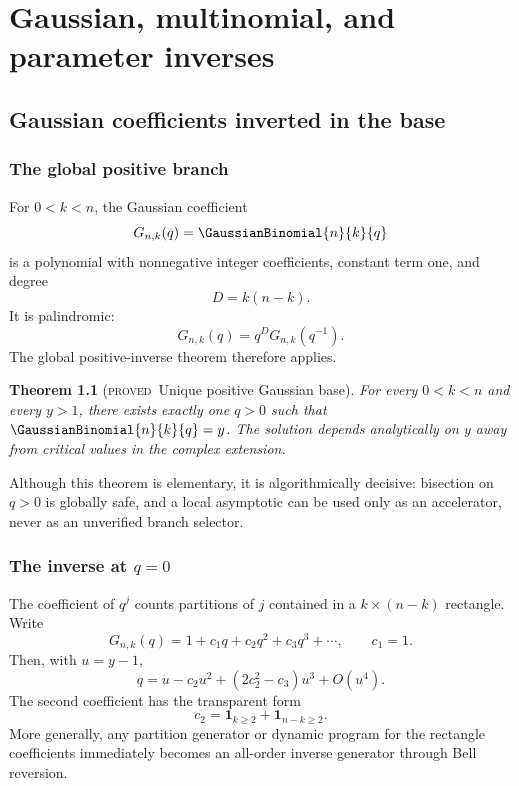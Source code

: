 \documentclass[11pt,letterpaper,oneside,openany]{book}
\newtheorem{theorem}{Theorem}[chapter]
\theoremstyle{definition}
\theoremstyle{remark}
\newcommand{\statusproved}{\textcolor{provedgreen}{\textsc{proved}}}
\begin{document}
\part{Gaussian, multinomial, and parameter inverses}

\chapter{Gaussian coefficients inverted in the base}

\section{The global positive branch}
For \(0<k<n\), the Gaussian coefficient
\[
 G_{n,k}(q)=\GaussianBinomial{n}{k}{q}
\]
is a polynomial with nonnegative integer coefficients, constant term one, and
degree
\[
 D=k(n-k).
\]
It is palindromic:
\begin{equation}\label{eq:gaussian-reciprocity}
 G_{n,k}(q)=q^DG_{n,k}(q^{-1}).
\end{equation}
The global positive-inverse theorem therefore applies.

\begin{theorem}[\statusproved\ Unique positive Gaussian base]
For every \(0<k<n\) and every \(y>1\), there exists exactly one \(q>0\) such
that \(\GaussianBinomial{n}{k}{q}=y\).  The solution depends analytically on \(y\) away from
critical values in the complex extension.
\end{theorem}

Although this theorem is elementary, it is algorithmically decisive: bisection
on \(q>0\) is globally safe, and a local asymptotic can be used only as an
accelerator, never as an unverified branch selector.

\section{The inverse at \texorpdfstring{\(q=0\)}{q=0}}
The coefficient of \(q^j\) counts partitions of \(j\) contained in a
\(k\times(n-k)\) rectangle.  Write
\[
 G_{n,k}(q)=1+c_1q+c_2q^2+c_3q^3+\cdots,
 \qquad c_1=1.
\]
Then, with \(u=y-1\),
\begin{equation}\label{eq:gaussian-q0-inverse}
 q=u-c_2u^2+(2c_2^2-c_3)u^3+O(u^4).
\end{equation}
The second coefficient has the transparent form
\[
 c_2=\mathbf 1_{k\ge2}+\mathbf 1_{n-k\ge2}.
\]
More generally, any partition generator or dynamic program for the rectangle
coefficients immediately becomes an all-order inverse generator through Bell
reversion.
\end{document}
